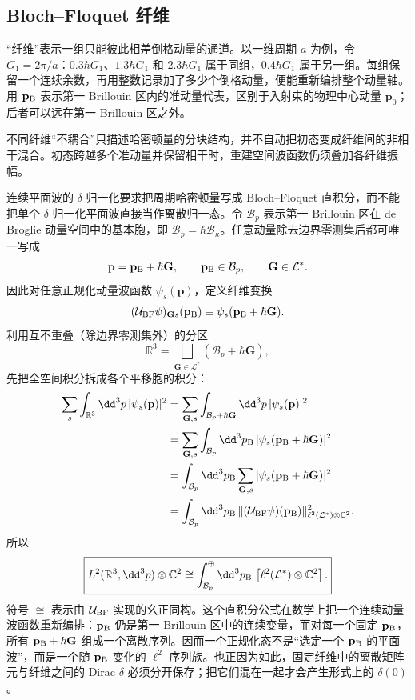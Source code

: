 \subsection{Bloch--Floquet 纤维}

“纤维”表示一组只能彼此相差倒格动量的通道。以一维周期 $a$ 为例，令 $G_1=2\pi/a$：$0.3\hbar G_1$、$1.3\hbar G_1$ 和 $2.3\hbar G_1$ 属于同组，$0.4\hbar G_1$ 属于另一组。每组保留一个连续余数，再用整数记录加了多少个倒格动量，便能重新编排整个动量轴。用 $\mathbf p_{\rm B}$ 表示第一 Brillouin 区内的准动量代表，区别于入射束的物理中心动量 $\mathbf p_0$；后者可以远在第一 Brillouin 区之外。

不同纤维“不耦合”只描述哈密顿量的分块结构，并不自动把初态变成纤维间的非相干混合。初态跨越多个准动量并保留相干时，重建空间波函数仍须叠加各纤维振幅。

连续平面波的 $\delta$ 归一化要求把周期哈密顿量写成 Bloch--Floquet 直积分，而不能把单个 $\delta$ 归一化平面波直接当作离散归一态。令 $\mathcal B_p$ 表示第一 Brillouin 区在
de Broglie 动量空间中的基本胞，即 $\mathcal B_p=\hbar\mathcal B_{\kappa}$。任意动量除去边界零测集后都可唯一写成
\begin{equation*}
\mathbf p=\mathbf p_{\rm B}+\hbar\mathbf G,
\qquad
\mathbf p_{\rm B}\in\mathcal B_p,
\qquad
\mathbf G\in\mathcal L^*.
\end{equation*}
因此对任意正规化动量波函数 $\psi_s(\mathbf p)$，定义纤维变换
\begin{equation*}
(\mathcal U_{\rm BF}\psi)_{\mathbf Gs}(\mathbf p_{\rm B})
\equiv
\psi_s(\mathbf p_{\rm B}+\hbar\mathbf G).
\end{equation*}
利用互不重叠（除边界零测集外）的分区
\[
\mathbb R^3
=\bigsqcup_{\mathbf G\in\mathcal L^*}
(\mathcal B_p+\hbar\mathbf G),
\]
先把全空间积分拆成各个平移胞的积分：
\begin{align*}
\sum_s\int_{\mathbb R^3}\dd^3 p\,|\psi_s(\mathbf p)|^2
&=\sum_{\mathbf G,s}
\int_{\mathcal B_p+\hbar\mathbf G}
\dd^3 p\,|\psi_s(\mathbf p)|^2\\
&=\sum_{\mathbf G,s}
\int_{\mathcal B_p}\dd^3 p_{\rm B}\,
|\psi_s(\mathbf p_{\rm B}+\hbar\mathbf G)|^2\\
&=\int_{\mathcal B_p}\dd^3 p_{\rm B}
\sum_{\mathbf G,s}
|\psi_s(\mathbf p_{\rm B}+\hbar\mathbf G)|^2\\
&=\int_{\mathcal B_p}\dd^3 p_{\rm B}\,
\| (\mathcal U_{\rm BF}\psi)(\mathbf p_{\rm B})\|_{\ell^2(\mathcal L^*)\otimes\mathbb C^2}^2.
\end{align*}
所以
\begin{equation}
\boxed{
L^2(\mathbb R^3,\dd^3 p)\otimes\mathbb C^2
\cong
\int_{\mathcal B_p}^{\oplus}\dd^3 p_{\rm B}\,
\left[\ell^2(\mathcal L^*)\otimes\mathbb C^2\right].}
\label{eq:bloch-floquet-direct-integral-dp68}
\end{equation}
符号 $\cong$ 表示由 $\mathcal U_{\rm BF}$ 实现的幺正同构。这个直积分公式在数学上把一个连续动量波函数重新编排：$\mathbf p_{\rm B}$ 仍是第一 Brillouin 区中的连续变量，而对每一个固定 $\mathbf p_{\rm B}$，所有 $\mathbf p_{\rm B}+\hbar\mathbf G$ 组成一个离散序列。因而一个正规化态不是“选定一个 $\mathbf p_{\rm B}$ 的平面波”，而是一个随 $\mathbf p_{\rm B}$ 变化的 $\ell^2$ 序列族。也正因为如此，固定纤维中的离散矩阵元与纤维之间的 Dirac $\delta$ 必须分开保存；把它们混在一起才会产生形式上的 $\delta(0)$。

